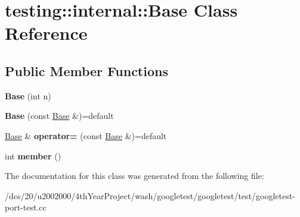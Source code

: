 \hypertarget{classtesting_1_1internal_1_1Base}{}\section{testing\+:\+:internal\+:\+:Base Class Reference}
\label{classtesting_1_1internal_1_1Base}
\subsection*{Public Member Functions}
\begin{DoxyCompactItemize}
\item 
\mbox{\label{classtesting_1_1internal_1_1Base_a255d105410a1eeb5f4690c9c8cd8e104}} 
{\bfseries Base} (int n)
\item 
\mbox{\label{classtesting_1_1internal_1_1Base_a7887d85cf4180ecb0f3cc4b5f3a10b35}} 
{\bfseries Base} (const \mbox{\hyperlink{classBase}{Base}} \&)=default
\item 
\mbox{\label{classtesting_1_1internal_1_1Base_a1d2ae2088e9555d6cb2473db2b9b6af2}} 
\mbox{\hyperlink{classBase}{Base}} \& {\bfseries operator=} (const \mbox{\hyperlink{classBase}{Base}} \&)=default
\item 
\mbox{\label{classtesting_1_1internal_1_1Base_a7ddba6221b56613be545544b7ef6214c}} 
int {\bfseries member} ()
\end{DoxyCompactItemize}


The documentation for this class was generated from the following file\+:\begin{DoxyCompactItemize}
\item 
/dcs/20/u2002000/4th\+Year\+Project/wash/googletest/googletest/test/googletest-\/port-\/test.\+cc\end{DoxyCompactItemize}
